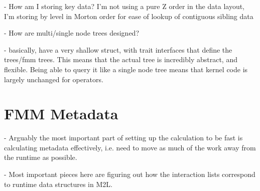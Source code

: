 - How am I storing key data? I'm not using a pure Z order in the data layout, I'm storing by level in Morton order for ease of lookup of contiguous sibling data

- How are multi/single node trees designed?

- basically, have a very shallow struct, with trait interfaces that define the trees/fmm trees. This means that the actual tree is incredibly abstract, and flexible. Being able to query it like a single node tree means that kernel code is largely unchanged for operators.


\section{FMM Metadata}

- Arguably the most important part of setting up the calculation to be fast is calculating metadata effectively, i.e. need to move as much of the work away from the runtime as possible.

- Most important pieces here are figuring out how the interaction lists correspond to runtime data structures in M2L.




